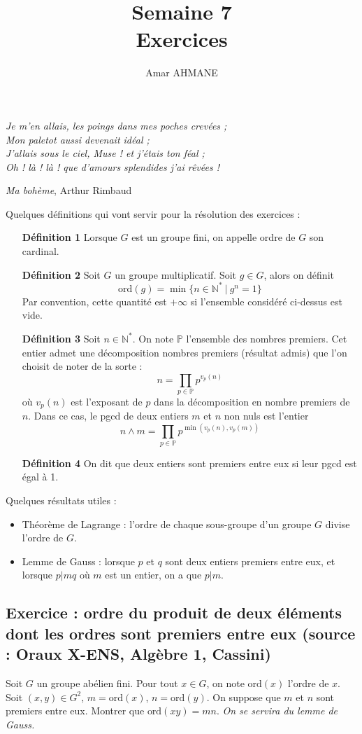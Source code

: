 \documentclass[17pt]{article}
\title{Semaine 7\\ Exercices}
\author{Amar AHMANE}
\def\N{\mathbb N}
\def\ord{\text{ord}}
\begin{document}
	\maketitle
	\begin{center}
		\textit{Je m'en allais, les poings dans mes poches crevées ;}\\
		\textit{Mon paletot aussi devenait idéal ;}\\
		\textit{J'allais sous le ciel, Muse ! et j'étais ton féal ;}\\
		\textit{Oh ! là ! là ! que d'amours splendides j'ai rêvées !}\\
	\end{center}
	\begin{flushright}
		\textit{Ma bohème}, Arthur Rimbaud
	\end{flushright}
	Quelques définitions qui vont servir pour la résolution des exercices : 
	\begin{itemize}
		\item[\bfseries Définition 1] Lorsque $G$ est un groupe fini, on appelle ordre de $G$ son cardinal.
		\item[\bfseries Définition 2] Soit $G$ un groupe multiplicatif. Soit $g\in G$, alors on définit \[\ord(g)=\min\lbrace n\in\N^*\ | \ g^n=1\rbrace\]
		Par convention, cette quantité est $+\infty$ si l'ensemble considéré ci-dessus est vide.
		\item[\bfseries Définition 3] Soit $n\in\N^*$. On note $\mathbb P$ l'ensemble des nombres premiers. Cet entier admet une décomposition nombres premiers (résultat admis) que l'on choisit de noter de la sorte : \[n=\prod_{p\in\mathbb P}p^{v_p(n)}\]
		où $v_p(n)$ est l'exposant de $p$ dans la décomposition en nombre premiers de $n$. Dans ce cas, le pgcd de deux entiers $m$ et $n$ non nuls est l'entier \[n\wedge m=\prod_{p\in\mathbb P}p^{\min(v_p(n),v_p(m))}\]
		\item[\bfseries Définition 4] On dit que deux entiers sont premiers entre eux si leur pgcd est égal à 1.
	\end{itemize}
	Quelques résultats utiles :
	\begin{itemize}
		\item Théorème de Lagrange : l'ordre de chaque sous-groupe d'un groupe $G$ divise l'ordre de $G$.
		\item Lemme de Gauss : lorsque $p$ et $q$ sont deux entiers premiers entre eux, et lorsque $p|mq$ où $m$ est un entier, on a que $p|m$.
	\end{itemize}
	\subsection*{Exercice : ordre du produit de deux éléments dont les ordres sont premiers entre eux (source : Oraux X-ENS, Algèbre 1, Cassini)}
	Soit $G$ un groupe abélien fini. Pour tout $x\in G$, on note $\ord(x)$ l'ordre de $x$.
	Soit $(x,y)\in G^2$, $m=\ord(x)$, $n=\ord(y)$. On suppose que $m$ et $n$ sont premiers entre eux. Montrer que $\ord(xy)=mn$. \textit{On se servira du lemme de Gauss.}
\end{document}
